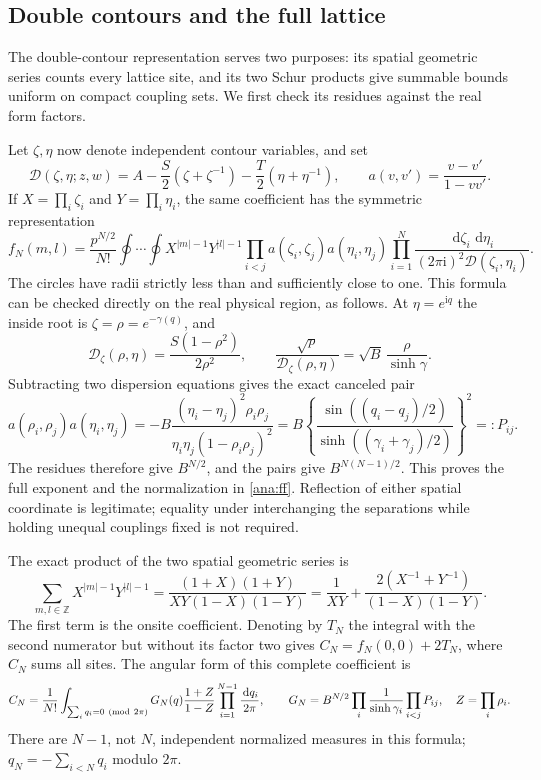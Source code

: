 \documentclass[11pt]{article}
\numberwithin{equation}{section}
\theoremstyle{definition}
\newcommand{\Z}{\mathbb Z}
\newcommand{\ii}{\mathrm i}
\newcommand{\dd}{\,\mathrm d}
\begin{document}
\subsection{Double contours and the full lattice}
\label{ana:double}

The double-contour representation serves two purposes: its spatial
geometric series counts every lattice site, and its two Schur products
give summable bounds uniform on compact coupling sets. We first
check its residues against the real form factors.

Let \(\zeta,\eta\) now denote independent contour variables, and set
\[
 \mathcal D(\zeta,\eta;z,w)=
 A-\frac S2(\zeta+\zeta^{-1})
  -\frac T2(\eta+\eta^{-1}),\qquad
 a(v,v')=\frac{v-v'}{1-vv'}.
\]
If \(X=\prod_i\zeta_i\) and \(Y=\prod_i\eta_i\), the same coefficient
has the symmetric representation
\begin{equation}\label{ana:doublecorr}
 f_N(m,l)=\frac{p^{N/2}}{N!}\oint\cdots\oint
 X^{|m|-1}Y^{|l|-1}
 \prod_{i<j}a(\zeta_i,\zeta_j)a(\eta_i,\eta_j)
 \prod_{i=1}^N
 \frac{\dd\zeta_i\,\dd\eta_i}{(2\pi\ii)^2\mathcal D(\zeta_i,\eta_i)}.
\end{equation}
The circles have radii strictly less than and sufficiently close to
one. This formula can be checked directly on the real physical
region, as follows. At \(\eta=e^{\ii q}\) the inside root is
\(\zeta=\rho=e^{-\gamma(q)}\), and
\[
 \mathcal D_\zeta(\rho,\eta)
   =\frac{S(1-\rho^2)}{2\rho^2},\qquad
 \frac{\sqrt p}{\mathcal D_\zeta(\rho,\eta)}
   =\sqrt B\,\frac{\rho}{\sinh\gamma}.
\]
Subtracting two dispersion equations gives the exact canceled pair
\begin{equation}\label{ana:pair}
 a(\rho_i,\rho_j)a(\eta_i,\eta_j)
 =-B\frac{(\eta_i-\eta_j)^2\rho_i\rho_j}
          {\eta_i\eta_j(1-\rho_i\rho_j)^2}
 =B\left\{\frac{\sin((q_i-q_j)/2)}
       {\sinh((\gamma_i+\gamma_j)/2)}\right\}^{\!2}
 =:P_{ij}.
\end{equation}
The residues therefore give \(B^{N/2}\), and the pairs give
\(B^{N(N-1)/2}\). This proves the full exponent and the normalization
in \eqref{ana:ff}. Reflection of either spatial coordinate is
legitimate; equality under interchanging the separations while holding
unequal couplings fixed is not required.

The exact product of the two spatial geometric series is
\begin{equation}\label{ana:fullsites}
 \sum_{m,l\in\Z}X^{|m|-1}Y^{|l|-1}
 =\frac{(1+X)(1+Y)}{XY(1-X)(1-Y)}
 =\frac1{XY}+\frac{2(X^{-1}+Y^{-1})}{(1-X)(1-Y)}.
\end{equation}
The first term is the onsite coefficient. Denoting by \(T_N\)
the integral with the second numerator but without its factor two
gives \(C_N=f_N(0,0)+2T_N\), where \(C_N\) sums all sites.
The angular form of this complete coefficient is
\begin{equation}\label{ana:angular}
 C_N=\frac1{N!}
 \int_{\sum_iq_i=0\ ({\rm mod}\ 2\pi)}
 G_N(q)\frac{1+Z}{1-Z}
 \prod_{i=1}^{N-1}\frac{\dd q_i}{2\pi},\qquad
 G_N=B^{N/2}\prod_i\frac1{\sinh\gamma_i}\prod_{i<j}P_{ij},
 \quad Z=\prod_i\rho_i.
\end{equation}
There are \(N-1\), not \(N\), independent normalized measures in this
formula; \(q_N=-\sum_{i<N}q_i\) modulo \(2\pi\).
\end{document}
